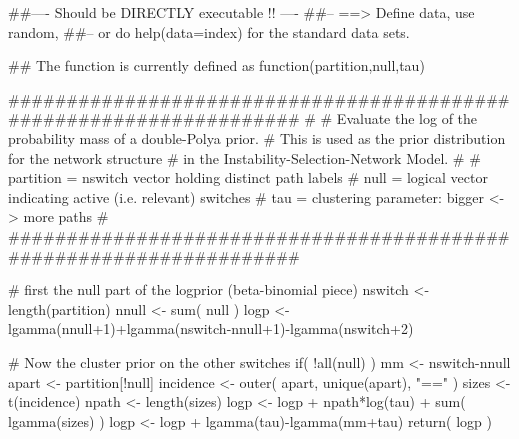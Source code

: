 \begin{Examples}
\begin{ExampleCode}
##---- Should be DIRECTLY executable !! ----
##-- ==>  Define data, use random,
##--         or do  help(data=index)  for the standard data sets.

## The function is currently defined as
function(partition,null,tau)
 {
  ####################################################################
  #
  # Evaluate the log of the probability mass of a double-Polya prior.
  # This is used as the prior distribution for the network structure
  # in the  Instability-Selection-Network Model.
  #
  # partition = nswitch vector holding distinct path labels
  # null = logical vector indicating active (i.e. relevant) switches
  # tau = clustering parameter: bigger <-> more paths
  #
  ####################################################################

  # first the null part of the logprior  (beta-binomial piece)
  nswitch <- length(partition)
  nnull <- sum( null )
  logp <- lgamma(nnull+1)+lgamma(nswitch-nnull+1)-lgamma(nswitch+2)

  # Now the cluster prior on the other switches
  if( !all(null) )
   {
    mm <- nswitch-nnull
    apart <- partition[!null] 
    incidence <- outer( apart, unique(apart), "==" )
    sizes <- t(incidence) 
    npath <- length(sizes)
    logp <- logp + npath*log(tau) + sum( lgamma(sizes) ) 
    logp <- logp + lgamma(tau)-lgamma(mm+tau)
   }
  return( logp )
 }
\end{ExampleCode}
\end{Examples}

